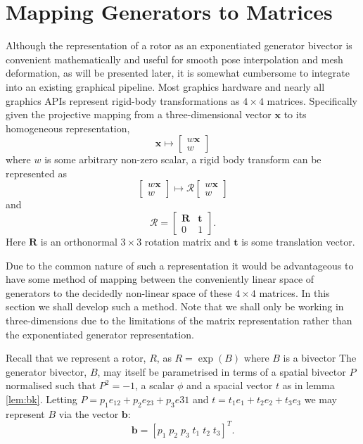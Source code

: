 

\section{Mapping Generators to Matrices}

Although the representation of a rotor as an exponentiated generator bivector
is convenient mathematically and useful for smooth pose interpolation
and mesh deformation, as will be presented later, it is somewhat cumbersome
to integrate into an existing graphical pipeline. Most graphics hardware and
nearly all graphics APIs represent rigid-body transformations as $4 \times 4$ matrices.
Specifically given the projective mapping from a three-dimensional vector $\mathbf{x}$ to
its homogeneous representation,
\[
\mathbf{x} \mapsto \left[ \begin{array}{c}
w \mathbf{x} \\ w
\end{array}\right]
\]
where $w$ is some arbitrary non-zero scalar, a rigid body transform can be represented as
\[
 \left[ \begin{array}{c}
w \mathbf{x} \\ w
\end{array}\right]
\mapsto
 \mathcal{R}\left[ \begin{array}{c}
w \mathbf{x} \\ w
\end{array}\right]
\]
and
\[
\mathcal{R} = \left[
\begin{array}{cc}
\mathbf{R} & \mathbf{t} \\
                0 & 1
\end{array}
\right].
\]
Here $\mathbf{R}$ is an orthonormal $3 \times 3$ rotation matrix and $\mathbf{t}$ is some
translation vector.

Due to the common nature of such a representation it would be advantageous to
have some method of mapping between the conveniently linear space of
generators to the decidedly non-linear space of these $4 \times 4$ matrices.
In this section we shall develop such a method. Note that we shall only be
working in three-dimensions due to the limitations of the matrix
representation rather than the exponentiated generator representation.

Recall that we represent a rotor, $R$, as $R = \exp(B)$ where $B$ is a bivector
The generator bivector, $B$, may itself be
parametrised in terms of a spatial bivector $P$ normalised such that
$P^2 = -1$, a scalar $\phi$ and a spacial vector $t$
as in lemma \ref{lem:bk}.
Letting $P = p_1 e_{12} + p_2 e_{23} + p_3 e{31}$ and
$t = t_1 e_1 + t_2 e_2 + t_3 e_3$ we may represent $B$ via the
vector $\mathbf{b}$:
\[
\mathbf{b} = [ p_1 \; p_2 \; p_3 \; t_1 \; t_2 \; t_3 ]^T.
\]

